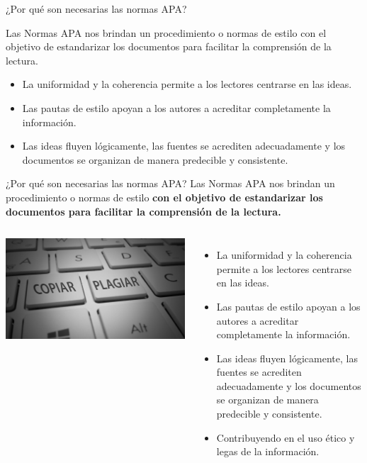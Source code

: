 \documentclass[
11pt, %
]{beamer}
\begin{document}
\begin{frame}{¿Por qué son necesarias las normas APA?}

	Las Normas APA nos brindan un procedimiento o normas de estilo con el objetivo
	de estandarizar los documentos para facilitar la comprensión de la lectura.
	\begin{itemize}
		\item La uniformidad y la coherencia permite a los lectores centrarse en las ideas.
		\item Las pautas de estilo apoyan a los autores a acreditar completamente la información.
		\item Las ideas fluyen lógicamente, las fuentes se acrediten adecuadamente y los documentos se organizan de manera predecible y consistente.
	\end{itemize}
\end{frame}

\begin{frame}{¿Por qué son necesarias las normas APA?}
	Las Normas APA nos brindan un procedimiento o normas de estilo \textbf{con el objetivo de estandarizar los documentos para facilitar la comprensión de la lectura.}
	\begin{columns} %
		\centering
		\includegraphics[width=\textwidth]{figura01.png} %
		\begin{itemize}
			\item La uniformidad y la coherencia permite a los lectores centrarse en las ideas.
			\item Las pautas de estilo apoyan a los autores a acreditar completamente la información.
			\item Las ideas fluyen lógicamente, las fuentes se acrediten adecuadamente y los documentos se organizan de manera predecible y consistente.
			\item Contribuyendo en el uso ético y legas de la información.
		\end{itemize}
	\end{columns}
\end{frame}
\end{document}
